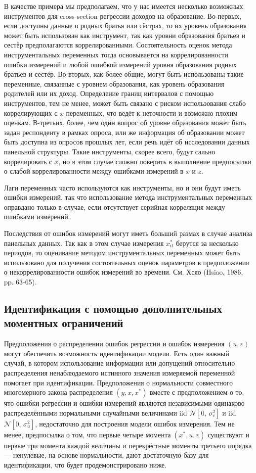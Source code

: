 В качестве примера мы предполагаем, что у нас имеется несколько возможных инструментов для cross-section регрессии доходов на образование. Во-первых, если доступны данные о родных братья или сёстрах, то их уровень образования может быть использован как инструмент, так как уровни образования братьев и сестёр предполагаются коррелированными. Состоятельность оценок метода инструментальных переменных тогда основывается на коррелированности ошибки измерений и любой ошибкой измерений уровня образования родных братьев и сестёр. Во-вторых, как более общие, могут быть использованы такие переменные, связанные с уровнем образования, как уровень образования родителей или их доход. Определение границ интервалов с помощью инструментов, тем не менее, может быть связано с риском использования слабо коррелирующих с $x$ переменных, что ведёт к неточности и возможно плохим оценкам. В-третьих, более, чем один вопрос об уровне образования может быть задан респонденту в рамках опроса, или же информация об образовании может быть доступна из опросов прошлых лет, если речь идёт об исследовании данных панельной структуры. Такие инструменты, скорее всего, будут сально коррелировать с $x$, но в этом случае сложно поверить в выполнение предпосылки о слабой коррелированности между ошибками измерений в $x$ и $z$.
 
Лаги переменных часто используются как инструменты, но и они будут иметь ошибки измерений, так что использование метода инструментальных переменных оправдано только в случае, если отсутствует серийная корреляция между ошибками измерений.

Последствия от ошибок измерений могут иметь больший размах в случае анализа панельных данных. Так как в этом случае измерения $x^*_{it}$ берутся за несколько периодов, то оценивание методом инструментальных переменных может быть использовано для получения состоятельных оценок параметров в предположении о некоррелированности ошибок измерений во времени. См. Хсяо (Hsiao, 1986, pp. 63-65).

\subsection{Идентификация с помощью дополнительных моментных ограничений} 
Предположения о распределении ошибок регрессии и ошибок измерения $(u, v)$ могут обеспечить возможность идентификации модели. Есть один важный случай, в котором использование информации или допущений относительно распределения ненаблюдаемого истинного значения измеряемой переменной помогает при идентификации. Предположения о нормальности совместного многомерного закона распределения $(y, x, x^*)$ вместе с предположением о то, что ошибки регрессии и ошибки измерений являются независимыми одинаково распределёнными нормальными случайными величинами iid $\mathcal{N}[0, \, \sigma^2_v]$ и  iid $\mathcal{N}[0, \, \sigma^2_u]$, недостаточно для построения модели ошибок измерения. Тем не менее, предпосылка о том, что первые четыре момента $(x^*, u, v)$ существуют и первые три момента каждой величины и перекрёстные моменты третьего порядка --- ненулевые, на основе нормальности, дают достаточную базу для идентификации, что будет продемонстрировано ниже.

